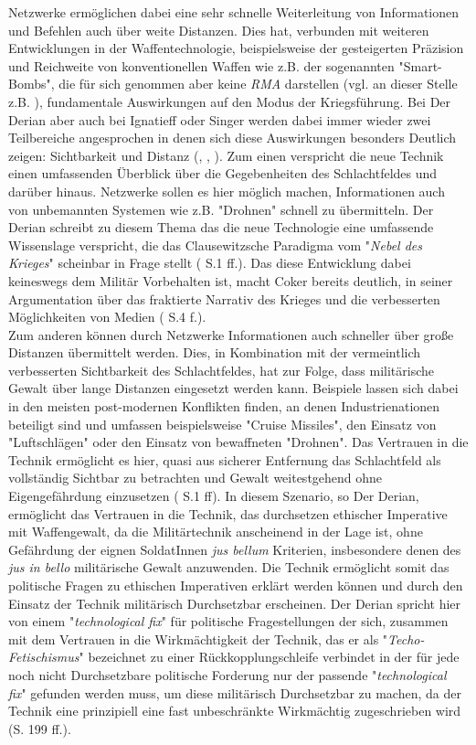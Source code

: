 \documentclass[11pt,a4paper,oneside,numbers=noenddot,bibliography=totocnumbered,DIV=13]{scrartcl}
\begin{document}
Netzwerke ermöglichen dabei eine sehr schnelle Weiterleitung von Informationen und Befehlen auch über weite Distanzen.
Dies hat, verbunden mit weiteren Entwicklungen in der Waffentechnologie, beispielsweise der gesteigerten Präzision und Reichweite von konventionellen Waffen wie z.B. der sogenannten "Smart-Bombs", die für sich genommen aber keine \textit{RMA} darstellen (vgl. an dieser Stelle z.B. \cite{ignatieff_virtual_2000}), fundamentale Auswirkungen auf den Modus der Kriegsführung. 
Bei Der Derian aber auch bei Ignatieff oder Singer werden dabei immer wieder zwei Teilbereiche angesprochen in denen sich diese Auswirkungen besonders Deutlich zeigen: Sichtbarkeit und Distanz (\cite{DerDerian2001}, \cite{ignatieff_virtual_2000}, \cite{singer_wired_2010}). 
Zum einen verspricht die neue Technik einen umfassenden Überblick über die Gegebenheiten des Schlachtfeldes und darüber hinaus. 
Netzwerke sollen es hier möglich machen, Informationen auch von unbemannten Systemen wie z.B. "Drohnen" schnell zu übermitteln. 
Der Derian schreibt zu diesem Thema das die neue Technologie eine umfassende Wissenslage verspricht, die das Clausewitzsche Paradigma vom "\textit{Nebel des Krieges}" scheinbar in Frage stellt (\cite{DerDerian2001} S.1 ff.).
Das diese Entwicklung dabei keineswegs dem Militär Vorbehalten ist, macht Coker bereits deutlich, in seiner Argumentation über das fraktierte Narrativ des Krieges und die verbesserten Möglichkeiten von Medien (\cite{coker_collision_2012} S.4 f.). \\
Zum anderen können durch Netzwerke Informationen auch schneller über große Distanzen übermittelt werden. 
Dies, in Kombination mit der vermeintlich verbesserten Sichtbarkeit des Schlachtfeldes, hat zur Folge, dass militärische Gewalt über lange Distanzen eingesetzt werden kann. 
Beispiele lassen sich dabei in den meisten post-modernen Konflikten finden, an denen Industrienationen beteiligt sind und umfassen beispielsweise "Cruise Missiles", den Einsatz von "Luftschlägen" oder den Einsatz von bewaffneten "Drohnen". 
Das Vertrauen in die Technik ermöglicht es hier, quasi aus sicherer Entfernung das Schlachtfeld als vollständig Sichtbar zu betrachten und Gewalt weitestgehend ohne Eigengefährdung einzusetzen (\cite{DerDerian2001} S.1 ff).
In diesem Szenario, so Der Derian, ermöglicht das Vertrauen in die Technik, das durchsetzen ethischer Imperative mit Waffengewalt, da die Militärtechnik anscheinend in der Lage ist, ohne Gefährdung der eignen SoldatInnen \textit{jus bellum} Kriterien, insbesondere denen des \textit{jus in bello} militärische Gewalt anzuwenden. 
Die Technik ermöglicht somit das politische Fragen zu ethischen Imperativen erklärt werden können und durch den Einsatz der Technik militärisch Durchsetzbar erscheinen. 
Der Derian spricht hier von einem "\textit{technological fix}" für politische Fragestellungen der sich, zusammen mit dem Vertrauen in die Wirkmächtigkeit der Technik, das er als "\textit{Techo-Fetischismus}" bezeichnet zu einer Rückkopplungschleife verbindet in der für jede noch nicht Durchsetzbare politische Forderung nur der passende "\textit{technological fix}" gefunden werden muss, um diese militärisch Durchsetzbar zu machen, da der Technik eine prinzipiell eine fast unbeschränkte Wirkmächtig zugeschrieben wird (\cite{DerDerian2001}S. 199 ff.).
\newpage
\end{document}
